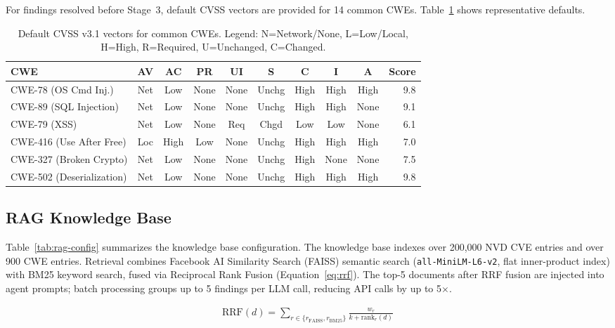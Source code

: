 \noindent For findings resolved before Stage~3, default CVSS vectors are provided for 14 common CWEs. Table~\ref{tab:cvss-vectors} shows representative defaults.

\begin{table}[H]
\centering
\small
\caption{Default CVSS v3.1 vectors for common CWEs. Legend: N=Network/None, L=Low/Local, H=High, R=Required, U=Unchanged, C=Changed.}
\label{tab:cvss-vectors}
\begin{tabular}{lccccccccr}
\toprule
\textbf{CWE} & \textbf{AV} & \textbf{AC} & \textbf{PR} & \textbf{UI} & \textbf{S} & \textbf{C} & \textbf{I} & \textbf{A} & \textbf{Score} \\
\midrule
CWE-78 (OS Cmd Inj.)  & Net & Low & None & None & Unchg & High & High & High & 9.8 \\
CWE-89 (SQL Injection) & Net & Low & None & None & Unchg & High & High & None & 9.1 \\
CWE-79 (XSS)           & Net & Low & None & Req  & Chgd  & Low  & Low  & None & 6.1 \\
CWE-416 (Use After Free)& Loc & High& Low  & None & Unchg & High & High & High & 7.0 \\
CWE-327 (Broken Crypto) & Net & Low & None & None & Unchg & High & None & None & 7.5 \\
CWE-502 (Deserialization)& Net& Low & None & None & Unchg & High & High & High & 9.8 \\
\bottomrule
\end{tabular}
\end{table}

\subsection{RAG Knowledge Base}

Table~\ref{tab:rag-config} summarizes the knowledge base configuration. The knowledge base indexes over 200,000 NVD CVE entries and over 900 CWE entries. Retrieval combines Facebook AI Similarity Search (FAISS) semantic search (\texttt{all-MiniLM-L6-v2}, flat inner-product index) with BM25 keyword search, fused via Reciprocal Rank Fusion (Equation~\ref{eq:rrf}). The top-5 documents after RRF fusion are injected into agent prompts; batch processing groups up to 5 findings per LLM call, reducing API calls by up to 5$\times$.

\begin{align}
\text{RRF}(d) = \sum_{r \in \{r_{\text{FAISS}}, r_{\text{BM25}}\}} \frac{w_r}{k + \text{rank}_r(d)}
\label{eq:rrf}
\end{align}

